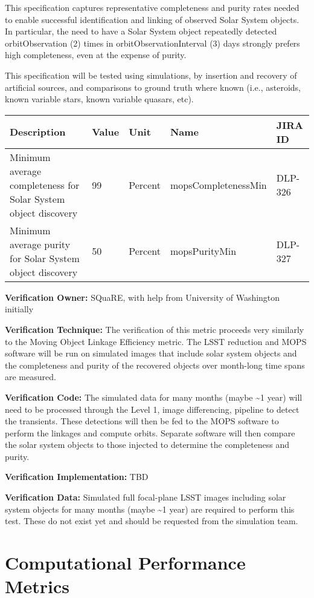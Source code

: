 \documentclass[DM,lsstdraft,toc]{lsstdoc}
\begin{document}
This specification captures representative completeness and purity rates
needed to enable successful identification and linking of observed Solar
System objects. In particular, the need to have a Solar System object
repeatedly detected orbitObservation (2) times in
orbitObservationInterval (3) days strongly prefers high completeness,
even at the expense of purity.

This specification will be tested using simulations, by insertion and
recovery of artificial sources, and comparisons to ground truth where
known (i.e., asteroids, known variable stars, known variable quasars,
etc).

\begin{longtable}[]{@{}p{}llll@{}}
\toprule
Description & Value & Unit & Name & JIRA ID\tabularnewline
\midrule
\endhead
Minimum average completeness for Solar System object discovery & 99 &
Percent & mopsCompletenessMin & DLP-326\tabularnewline
Minimum average purity for Solar System object discovery & 50 & Percent
& mopsPurityMin & DLP-327\tabularnewline
\bottomrule
\end{longtable}

\textbf{Verification Owner:} SQuaRE, with help from University of
Washington initially

\textbf{Verification Technique:} The verification of this metric
proceeds very similarly to the Moving Object Linkage Efficiency metric.
The LSST reduction and MOPS software will be run on simulated images
that include solar system objects and the completeness and purity of the
recovered objects over month-long time spans are measured.

\textbf{Verification Code:} The simulated data for many months (maybe
\textasciitilde{}1 year) will need to be processed through the Level 1,
image differencing, pipeline to detect the transients. These detections
will then be fed to the MOPS software to perform the linkages and
compute orbits. Separate software will then compare the solar system
objects to those injected to determine the completeness and purity.

\textbf{Verification Implementation:} TBD

\textbf{Verification Data:} Simulated full focal-plane LSST images
including solar system objects for many months (maybe \textasciitilde{}1
year) are required to perform this test. These do not exist yet and
should be requested from the simulation team.

\section{Computational Performance
Metrics}\label{computational-performance-metrics}
\end{document}
